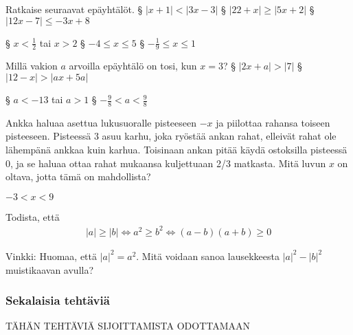 \begin{tehtavasivu}
\begin{tehtava}
Ratkaise seuraavat epäyhtälöt.
	\alakohdat
		§ $|x+1|<|3x-3|$
		§ $|22+x| \geq |5x+2|$
		§ $|12x-7| \leq -3x+8$
	\loppu
	\begin{vastaus}
		\alakohdat
			§ $x< \frac{1}{2}$ tai $x>2$
			§ $-4 \leq x \leq 5$
			§ $-\frac{1}{9} \leq x \leq 1$
		\loppu
	\end{vastaus}
\end{tehtava}

\begin{tehtava}
Millä vakion $a$ arvoilla epäyhtälö on tosi, kun $x=3$?
	\alakohdat
		§ $|2x+a|>|7|$
		§ $|12-x| > |ax+5a|$
	\loppu
	\begin{vastaus}
		\alakohdat
			§ $a< -13$ tai $a>1$
			§ $-\frac{9}{8} < a < \frac{9}{8}$
		\loppu
	\end{vastaus}
\end{tehtava}

\begin{tehtava}
	Ankka haluaa asettua lukusuoralle pisteeseen $-x$ ja piilottaa rahansa toiseen pisteeseen. Pisteessä $3$ asuu karhu, joka ryöstää ankan rahat, elleivät rahat ole lähempänä ankkaa kuin karhua. Toisinaan ankan pitää käydä ostoksilla pisteessä $0$, ja se haluaa ottaa rahat mukaansa kuljettuaan 2/3 matkasta. Mitä luvun $x$ on oltava, jotta tämä on mahdollista?
	\begin{vastaus}
		$-3<x<9$
	\end{vastaus}
\end{tehtava}

\begin{tehtava}
	Todista, että
	\begin{align*}
		|a| \geq |b| \Leftrightarrow a^2 \geq b^2 \Leftrightarrow (a-b)(a+b) \geq 0
	\end{align*}
	\begin{vastaus}
		Vinkki: Huomaa, että $|a|^2 = a^2$. Mitä voidaan sanoa lausekkeesta $|a|^2-|b|^2$ muistikaavan avulla?
	\end{vastaus}
\end{tehtava}

\subsubsection*{Sekalaisia tehtäviä}

TÄHÄN TEHTÄVIÄ SIJOITTAMISTA ODOTTAMAAN





\end{tehtavasivu}
